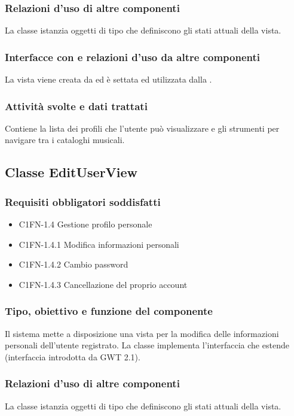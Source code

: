 \subsubsection*{Relazioni d'uso di altre componenti} 
La classe istanzia oggetti di tipo  che definiscono gli stati
attuali della vista.
\subsubsection*{Interfacce con e relazioni d'uso da altre componenti}
 La vista viene creata da  ed \`e settata ed utilizzata dalla
 .
 \subsubsection*{Attivit\`a svolte e dati trattati}
Contiene la lista dei profili che l'utente pu\`o visualizzare e gli strumenti
per navigare tra i cataloghi musicali.

\subsection{Classe EditUserView}
\subsubsection*{Requisiti obbligatori soddisfatti}
\begin{itemize}
	\item C1FN-1.4 Gestione profilo personale
	\item C1FN-1.4.1 Modifica informazioni personali
	\item C1FN-1.4.2 Cambio password
	\item C1FN-1.4.3 Cancellazione del proprio account
\end{itemize}
\subsubsection*{Tipo, obiettivo e funzione del componente}
Il sistema mette a disposizione una vista per la
modifica delle informazioni personali dell'utente registrato. La classe
 implementa l'interfaccia  che estende
 (interfaccia introdotta da GWT 2.1).

\subsubsection*{Relazioni d'uso di altre componenti}
La classe istanzia oggetti di tipo  che definiscono gli stati
attuali della vista.
